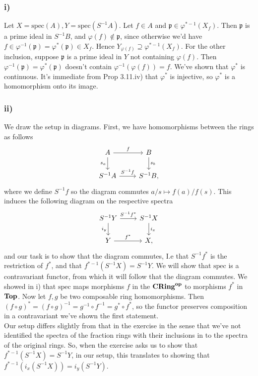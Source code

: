 \documentclass{article}
\let\temp\phi
\let\phi\varphi
\let\varphi\temp
\theoremstyle{definition}
\newcommand{\spec}{\text{spec}}
\newcommand{\catname}[1]{{\normalfont\textbf{#1}}}
\newcommand{\CRing}{\catname{CRing}}
\newcommand{\Top}{\catname{Top}}
\newcommand{\op}{\catname{op}}
\begin{document}
\subsubsection*{i)}

Let $X = \spec(A), Y = \spec(S^{-1}A)$. Let $f \in A$ and $\mathfrak{p} \in
\phi^{*-1}(X_f)$. Then $\mathfrak{p}$ is a prime ideal in $S^{-1}B$, and
$\phi(f) \not \in \mathfrak{p}$, since otherwise we'd have $f \in
\phi^{-1}(\mathfrak{p}) = \phi^*(\mathfrak{p}) \in X_f$. Hence $Y_{\phi(f)}
\supseteq \phi^{*-1}(X_f)$. For the other inclusion, suppose $\mathfrak{p}$
is a prime ideal in $Y$ not containing $\phi(f)$. Then $\phi^{-1}(\mathfrak{p})
= \phi^{*}(\mathfrak{p})$ doesn't contain $\phi^{-1}(\phi(f)) = f$. We've shown
that $\phi^{*}$ is continuous. It's immediate from Prop 3.11.iv) that
$\phi^{*}$ is injective, so $\phi^{*}$ is a homomorphism onto its image.


\subsubsection*{ii)}

We draw the setup in diagrams. First, we have homomorphisms between the rings as follows
\[ 
	\begin{tikzcd}
		A \arrow{r}{f} \arrow[swap]{d}{s_a} & B \arrow{d}{s_b} \\
		S^{-1}A \arrow{r}{S^{-1}f}& S^{-1}B,
	\end{tikzcd}
\]
where we define $S^{-1}f$ so the diagram commutes $a/s \mapsto f(a)/f(s)$.
This induces the following diagram on the respective spectra
\[ 
	\begin{tikzcd}
		S^{-1}Y \arrow{r}{S^{-1}f^{*}} \arrow[swap]{d}{i_y} & S^{-1}X \arrow{d}{i_x} \\
		Y \arrow{r}{f^{*}}& X,
	\end{tikzcd}
\]
and our task is to show that the diagram commutes, I.e that $S^{-1}f^{*}$ is
the restriction of $f^{*}$, and that $f^{*-1}(S^{-1}X) = S^{-1}Y$. We will
show that $\spec$ is a contravariant functor, from which it will follow that
the diagram commutes. We showed in i) that $\spec$ maps morphisms $f$ in the
$\CRing^{\op}$ to morphisms $f^{*}$ in $\Top$. Now let $f, g$ be two composable
ring homomorphisms. Then $(f \circ g)^{*} = (f \circ g)^{-1} = g^{-1} \circ
f^{-1} = g^{*} \circ f^{*}$, so the functor preserves composition in a
contravariant we've shown the first statement. \\

Our setup differs slightly from that in the exercise in the sense that we've
not identified the spectra of the fraction rings with their inclusions in to
the spectra of the original rings. So, when the exercise asks us to show that
$f^{*-1}(S^{-1}X) = S^{-1}Y$, in our setup, this translates to showing that
$f^{*-1}(i_x(S^{-1}X)) = i_y(S^{-1}Y)$. \\
\end{document}
